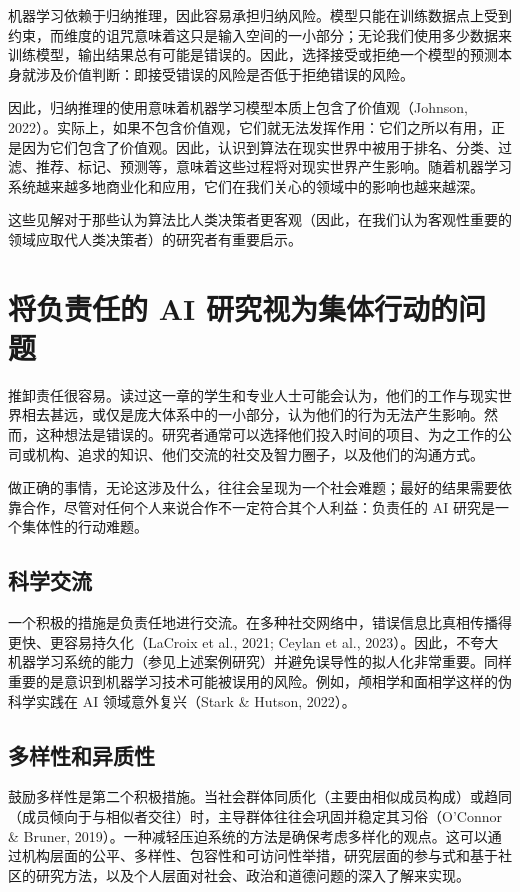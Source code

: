 机器学习依赖于归纳推理，因此容易承担归纳风险。模型只能在训练数据点上受到约束，而维度的诅咒意味着这只是输入空间的一小部分；无论我们使用多少数据来训练模型，输出结果总有可能是错误的。因此，选择接受或拒绝一个模型的预测本身就涉及价值判断：即接受错误的风险是否低于拒绝错误的风险。

因此，归纳推理的使用意味着机器学习模型本质上包含了价值观（Johnson, 2022）。实际上，如果不包含价值观，它们就无法发挥作用：它们之所以有用，正是因为它们包含了价值观。因此，认识到算法在现实世界中被用于排名、分类、过滤、推荐、标记、预测等，意味着这些过程将对现实世界产生影响。随着机器学习系统越来越多地商业化和应用，它们在我们关心的领域中的影响也越来越深。

这些见解对于那些认为算法比人类决策者更客观（因此，在我们认为客观性重要的领域应取代人类决策者）的研究者有重要启示。


\section{将负责任的 AI 研究视为集体行动的问题}
推卸责任很容易。读过这一章的学生和专业人士可能会认为，他们的工作与现实世界相去甚远，或仅是庞大体系中的一小部分，认为他们的行为无法产生影响。然而，这种想法是错误的。研究者通常可以选择他们投入时间的项目、为之工作的公司或机构、追求的知识、他们交流的社交及智力圈子，以及他们的沟通方式。

做正确的事情，无论这涉及什么，往往会呈现为一个社会难题；最好的结果需要依靠合作，尽管对任何个人来说合作不一定符合其个人利益：负责任的 AI 研究是一个集体性的行动难题。

\subsection{科学交流}
一个积极的措施是负责任地进行交流。在多种社交网络中，错误信息比真相传播得更快、更容易持久化（LaCroix et al., 2021; Ceylan et al., 2023）。因此，不夸大机器学习系统的能力（参见上述案例研究）并避免误导性的拟人化非常重要。同样重要的是意识到机器学习技术可能被误用的风险。例如，颅相学和面相学这样的伪科学实践在 AI 领域意外复兴（Stark \& Hutson, 2022）。

\subsection{多样性和异质性}
鼓励多样性是第二个积极措施。当社会群体同质化（主要由相似成员构成）或趋同（成员倾向于与相似者交往）时，主导群体往往会巩固并稳定其习俗（O’Connor \& Bruner, 2019）。一种减轻压迫系统的方法是确保考虑多样化的观点。这可以通过机构层面的公平、多样性、包容性和可访问性举措，研究层面的参与式和基于社区的研究方法，以及个人层面对社会、政治和道德问题的深入了解来实现。

